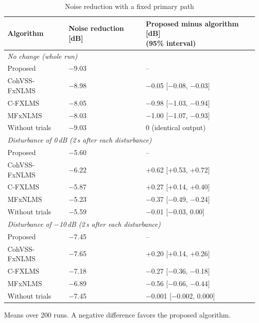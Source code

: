 \begin{table}[tbp]
\centering
\caption{Noise reduction with a fixed primary path}
\label{tab:atsip-3}
\begin{tabular}{lll}
\toprule
Algorithm & Noise reduction [dB] & \makecell[l]{Proposed minus algorithm [dB]\\(95\% interval)} \\
\midrule
\multicolumn{3}{l}{\textit{No change (whole run)}} \\
Proposed & $-$9.03 & -- \\
CohVSS-FxNLMS & $-$8.98 & $-$0.05 [$-$0.08, $-$0.03] \\
C-FXLMS & $-$8.05 & $-$0.98 [$-$1.03, $-$0.94] \\
MFxNLMS & $-$8.03 & $-$1.00 [$-$1.07, $-$0.93] \\
Without trials & $-$9.03 & 0 (identical output) \\
\multicolumn{3}{l}{\textit{Disturbance of 0\,dB (2\,s after each disturbance)}} \\
Proposed & $-$5.60 & -- \\
CohVSS-FxNLMS & $-$6.22 & +0.62 [+0.53, +0.72] \\
C-FXLMS & $-$5.87 & +0.27 [+0.14, +0.40] \\
MFxNLMS & $-$5.23 & $-$0.37 [$-$0.49, $-$0.24] \\
Without trials & $-$5.59 & $-$0.01 [$-$0.03, 0.00] \\
\multicolumn{3}{l}{\textit{Disturbance of $-$10\,dB (2\,s after each disturbance)}} \\
Proposed & $-$7.45 & -- \\
CohVSS-FxNLMS & $-$7.65 & +0.20 [+0.14, +0.26] \\
C-FXLMS & $-$7.18 & $-$0.27 [$-$0.36, $-$0.18] \\
MFxNLMS & $-$6.89 & $-$0.56 [$-$0.66, $-$0.44] \\
Without trials & $-$7.45 & $-$0.001 [$-$0.002, 0.000] \\
\bottomrule
\end{tabular}
\par\medskip
\begin{minipage}{0.98\textwidth}
\footnotesize
Means over 200 runs. A negative difference favors the proposed algorithm.\par
\end{minipage}
\end{table}
